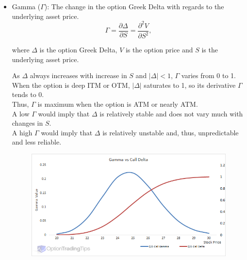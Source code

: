 \documentclass{article}
\begin{document}
\begin{itemize}
    \item Gamma ($\Gamma$): The change in the option Greek Delta with regards to the underlying asset price.
          \begin{equation*}
              \Gamma = \frac{\partial \Delta}{\partial S} = \frac{\partial^2 V}{\partial S^2},
          \end{equation*}
          \begin{center}
              where $\Delta$ is the option Greek Delta, $V$ is the option price and $S$ is the underlying asset price.
          \end{center}
          As $\Delta$ always increases with increase in $S$ and $|\Delta| < 1$, $\Gamma$ varies from 0 to 1. \\
          When the option is deep ITM or OTM, $|\Delta|$ saturates to 1, so its derivative $\Gamma$ tends to 0. \\
          Thus, $\Gamma$ is maximum when the option is ATM or nearly ATM. \\
          A low $\Gamma$ would imply that $\Delta$ is relatively stable and does not vary much with changes in $S$. \\
          A high $\Gamma$ would imply that $\Delta$ is relatively unstable and, thus, unpredictable and less reliable.
          \begin{figure}[H]
              \centering
              \includegraphics[scale=0.5]{Gamma.png}
          \end{figure}


\end{itemize}
\end{document}
